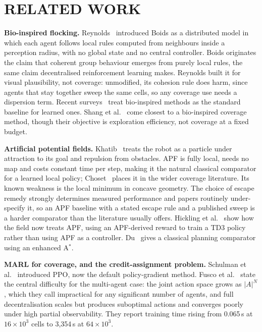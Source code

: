 \documentclass[a4paper, 10pt, conference]{ieeeconf}
\begin{document}
\section{RELATED WORK}\label{sec:related}

\textbf{Bio-inspired flocking.} Reynolds~\cite{reynolds1987}
introduced Boids as a distributed model in which each agent follows
local rules computed from neighbours inside a perception radius, with
no global state and no central controller. Boids originates the claim
that coherent group behaviour emerges from purely local rules, the
same claim decentralised reinforcement learning makes. Reynolds built
it for visual plausibility, not coverage: unmodified, its cohesion
rule does harm, since agents that stay together sweep the same cells,
so any coverage use needs a dispersion term. Recent
surveys~\cite{xu2022,alqudsi2024,arshid2025} treat bio-inspired
methods as the standard baseline for learned ones. Shang et
al.~\cite{shang2025} come closest to a bio-inspired coverage method,
though their objective is exploration efficiency, not coverage at a
fixed budget.

\textbf{Artificial potential fields.} Khatib~\cite{khatib1986} treats
the robot as a particle under attraction to its goal and repulsion
from obstacles. APF is fully local, needs no map and costs constant
time per step, making it the natural classical comparator for a
learned local policy; Choset~\cite{choset2001} places it in the wider
coverage literature. Its known weakness is the local minimum in
concave geometry. The choice of escape remedy strongly determines
measured performance and papers routinely under-specify it, so an APF
baseline with a stated escape rule and a published sweep is a harder
comparator than the literature usually offers. Hickling et
al.~\cite{hickling2025} show how the field now treats APF, using an
APF-derived reward to train a TD3 policy rather than using APF as a
controller. Du~\cite{du2023} gives a classical planning comparator
using an enhanced A$^*$.

\textbf{MARL for coverage, and the credit-assignment problem.}
Schulman et al.~\cite{schulman2017} introduced PPO, now the default
policy-gradient method. Fusco et al.~\cite{fusco2025} state the
central difficulty for the multi-agent case: the joint action space
grows as $|A|^N$, which they call impractical for any significant
number of agents, and full decentralisation scales but produces
suboptimal actions and converges poorly under high partial
observability. They report training time rising from 0.065\,s at
$16\times10^3$ cells to 3{,}354\,s at $64\times10^3$.
\end{document}

